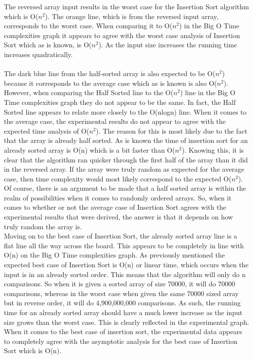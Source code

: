 \documentclass[12pt]{article}
\begin{document}
	The reversed array input results in the worst case for the Insertion Sort algorithm which is O($n^2$). The orange line, which is from the reversed input array, corresponds to the worst case. When comparing it to O($n^2$) in the Big O Time complexities graph it appears to agree with the worst case analysis of Insertion Sort  which as is known, is O($n^2$). As the input size increases the running time increases quadratically.\\ 
\\
\indent The dark blue line from the half-sorted array is also expected to be O($n^2$) because it corresponds to the average case which as is known is also O($n^2$). However, when comparing the Half Sorted line to the O($n^2$) line in the Big O Time complexities graph they do not appear to be the same. In fact, the Half Sorted line appears to relate more closely to the O(nlogn) line. When it comes to the average case, the experimental results do not appear to agree with the expected time analysis of O($n^2$). The reason for this is most likely due to the fact that the array is already half sorted. As is known the time of insertion sort for an already sorted array is O(n) which is a bit faster than O($n^2$). Knowing this, it is clear that the algorithm ran quicker through the first half of the array than it did in the reversed array. If the array were truly random as expected for the average case, then time complexity would most likely correspond to the expected O($n^2$). Of course, there is an argument to be made that a half sorted array is within the realm of possibilities when it comes to randomly ordered arrays. So, when it comes to whether or not the average case of Insertion Sort agrees with the experimental results that were derived, the answer is that it depends on how truly random the array is.\\ 
\indent	Moving on to the best case of Insertion Sort, the already sorted array line is a flat line all the way across the board. This appears to be completely in line with O(n) on the Big O Time complexities graph. As previously mentioned the expected best case of Insertion Sort is O(n) or linear time, which occurs when the input is in an already sorted order. This means that the algorithm will only do n comparisons. So when it is given a sorted array of size 70000, it will do 70000 comparisons, whereas in the worst case when given the same 70000 sized array but in reverse order, it will do 4,900,000,000 comparisons. As such, the running time for an already sorted array should have a much lower increase as the input size grows than the worst case. This is clearly reflected in the experimental graph. When it comes to the best case of insertion sort, the experimental data appears to completely agree with the asymptotic analysis for the best case of Insertion Sort which is O(n).\\
\\
\\
\\
\\
\\
\\
\\
\end{document}
